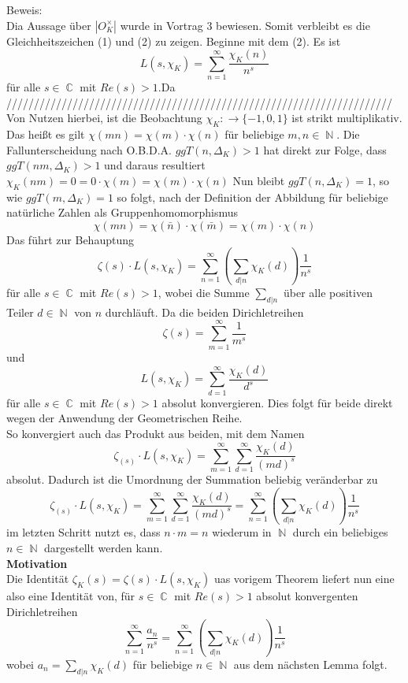 \documentclass[10pt,a4paper]{article}
\DeclareMathOperator{\C}{\mathbb{C}}
\DeclareMathOperator{\N}{\mathbb{N}}
\begin{document}
\\
\\
 Beweis:
 \\
 Dia Aussage über $|O_K^\times|$ wurde in Vortrag 3 bewiesen. Somit verbleibt es die Gleichheitszeichen (1) und (2) zu zeigen. Beginne mit dem (2). Es ist $$L(s,\chi_K)=\sum_{n=1}^{\infty}\frac{\chi_K(n)}{n^s}$$ für alle $s \in \C$ mit $Re(s) > 1$.Da //////////////////////////////////////////////////////////////////////
 \\
Von Nutzen hierbei, ist die Beobachtung $\chi_K \colon \rightarrow \{-1,0,1\}$ ist strikt multiplikativ. Das heißt es gilt $\chi(mn)=\chi(m)\cdot\chi(n)$ für beliebige $m,n \in \N$. Die Fallunterscheidung nach O.B.D.A. $ggT(n,\Delta_K)>1$ hat direkt zur Folge, dass $ggT(nm,\Delta_K)>1$ und daraus resultiert $\chi_K(nm)=0=0\cdot \chi(m)= \chi(m)\cdot \chi(n)$
Nun bleibt $ggT(n,\Delta_K)=1$, so wie $ggT(m,\Delta_K)=1$ so folgt, nach der Definition der Abbildung für beliebige natürliche Zahlen als Gruppenhomomorphismus $$\chi(mn)=\chi(\bar{n})\cdot \chi(\bar{m})= \chi(m)\cdot \chi(n)$$
 Das führt zur Behauptung $$\zeta(s)\cdot L(s,\chi_K) = \sum_{n=1}^{\infty}(\sum_{d|n}\chi_K(d))\frac{1}{n^s}$$ für alle $s \in \C$ mit $Re(s) >1$, wobei die Summe $\sum_{d|n}$ über alle positiven Teiler $d \in \N$ von $n$ durchläuft. Da die beiden Dirichletreihen $$\zeta(s) = \sum_{m=1}^{\infty}\frac{1}{m^s} $$ und $$L(s,\chi_K)= \sum_{d=1}^{\infty}\frac{\chi_K(d)}{d^s}$$ für alle $s \in \C$ mit $Re(s) >1$ absolut konvergieren. Dies folgt für beide direkt wegen der Anwendung der Geometrischen Reihe.
 \\
 So konvergiert auch das Produkt aus beiden, mit dem Namen $$\zeta_(s) \cdot L(s,\chi_K) = \sum_{m=1}^{\infty} \sum_{d=1}^{\infty}\frac{\chi_K(d)}{(md)^s}$$ absolut.
 Dadurch ist die Umordnung der Summation beliebig veränderbar zu $$\zeta_(s) \cdot L(s,\chi_K)=\sum_{m=1}^{\infty} \sum_{d=1}^{\infty}\frac{\chi_K(d)}{(md)^s}= \sum_{n=1}^{\infty}(\sum_{d|n}\chi_K(d))\frac{1}{n^s}$$ im letzten Schritt nutzt es, dass $n \cdot m = n$ wiederum in $\N$ durch ein beliebiges $n \in \N$ dargestellt werden kann.
 \\
 \textbf{Motivation}
 \\
Die Identität  $\zeta_K(s) = \zeta(s)\cdot L(s,\chi_K) $ uas vorigem Theorem liefert nun eine also eine Identität von, für $s \in \C$ mit $Re(s) > 1$ absolut konvergenten Dirichletreihen$$ \sum_{n=1}^{\infty}\frac{a_n}{n^s}= \sum_{n=1}^{\infty}(\sum_{d|n}\chi_K(d))\frac{1}{n^s}$$
wobei $a_n = \sum_{d|n}\chi_K(d)$ für beliebige $n \in \N$ aus dem nächsten Lemma folgt.
\end{document}
